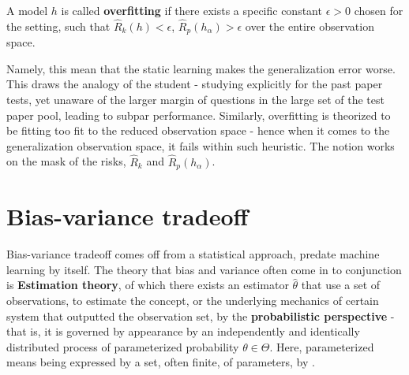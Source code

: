 \documentclass[10pt,oneside,oldfontcommands,dvipsnames,article]{memoir}
\begin{document}
\begin{definition}[Overfitting]
  A model $h$ is called \textbf{overfitting} if there exists a specific constant $\epsilon>0$ chosen for the setting, such that $\hat{R}_{k}(h)<\epsilon$, $\hat{R}_{p}(h_{\alpha})> \epsilon$ over the entire observation space.
\end{definition}
Namely, this mean that the static learning makes the generalization error worse. This draws the analogy of the student - studying explicitly for the past paper tests, yet unaware of the larger margin of questions in the large set of the test paper pool, leading to subpar performance. Similarly, overfitting is theorized to be fitting too fit to the reduced observation space - hence when it comes to the generalization observation space, it fails within such heuristic. The notion works on the mask of the risks, $\hat{R}_{k}$ and $\hat{R}_{p}(h_{\alpha})$. 

\clearpage


\section{Bias-variance tradeoff}

Bias-variance tradeoff comes off from a statistical approach, predate machine learning by itself. The theory that bias and variance often come in to conjunction is \textbf{Estimation theory}, of which there exists an estimator $\hat{\theta}$ that use a set of observations, to estimate the concept, or the underlying mechanics of certain system that outputted the observation set, by the \textbf{probabilistic perspective} - that is, it is governed by appearance by an independently and identically distributed process of parameterized probability $\theta\in \Theta$. Here, parameterized means being expressed by a set, often finite, of parameters, by \cite{LehmannCasella_theory_1998,liam_statistics_2005}. 
\end{document}
